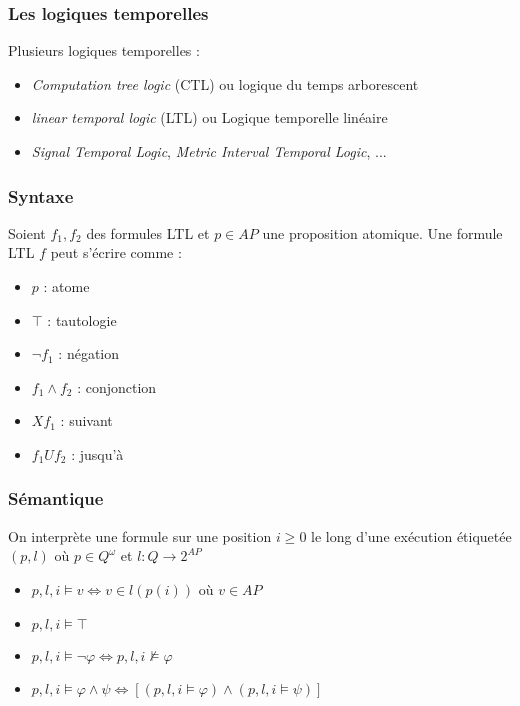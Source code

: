 \documentclass{beamer}
\theoremstyle{plain}
\theoremstyle{definition}
\begin{document}
\begin{frame}
  \frametitle{Les logiques temporelles}

  \pause
  Plusieurs logiques temporelles :
  \begin{itemize}[<+->]
  \item \textit{Computation tree logic} (CTL) ou logique du temps arborescent
  \item \textit{linear temporal logic} (LTL) ou Logique temporelle linéaire
  \item \textit{Signal Temporal Logic}, \textit{Metric Interval Temporal Logic}, ...
  \end{itemize}
\end{frame}

\begin{frame}
  \frametitle{Syntaxe}

  Soient $f_1, f_2$ des formules LTL et $p \in AP$ une proposition atomique.
  Une formule LTL $f$ peut s'écrire comme :
  \begin{itemize}
  \item $p$ : atome
  \item $\top$ : tautologie
  \item $\lnot f_1$ : négation
  \item $f_1 \land f_2$ : conjonction
    \pause
  \item $X f_1$ : suivant
  \item $f_1 U f_2$ : jusqu'à
  \end{itemize}  
\end{frame}


\begin{frame}
  \frametitle{Sémantique}

  On interprète une formule sur une position $i \geq 0$ le long d'une exécution étiquetée $(p, l)$ où $p \in Q^\omega$ et $l : Q \to 2^{AP}$ 

  \vfill  
  \vfill
  
  \pause
  
  \begin{itemize}
  \item $p,l,i \models v \Leftrightarrow v \in l(p(i))$ où $v \in AP$
  \item $p,l,i \models \top$
  \item $p,l,i \models \lnot \varphi \Leftrightarrow p,l,i \not \models \varphi$
  \item $p,l,i \models \varphi \land \psi \Leftrightarrow [(p,l,i \models \varphi) \land (p,l,i \models \psi)]$
  \end{itemize}
\end{frame}
\end{document}
